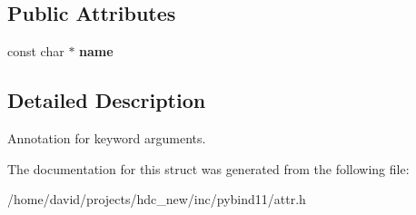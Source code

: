 \subsection*{Public Attributes}
\begin{DoxyCompactItemize}
\item 
const char $\ast$ {\bfseries name}\hypertarget{structarg_a19d6eebdcc5e2c4679c5f77760adb5dc}{}\label{structarg_a19d6eebdcc5e2c4679c5f77760adb5dc}

\end{DoxyCompactItemize}


\subsection{Detailed Description}
Annotation for keyword arguments. 

The documentation for this struct was generated from the following file\+:\begin{DoxyCompactItemize}
\item 
/home/david/projects/hdc\+\_\+new/inc/pybind11/attr.\+h\end{DoxyCompactItemize}
